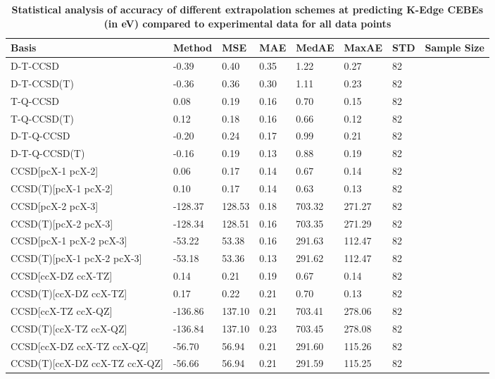 \begin{table}
  \caption{\textbf{Statistical analysis of accuracy of different extrapolation schemes at predicting K-Edge CEBEs (in eV) compared to experimental data for all data points}}
  \label{tbl:extrap-all-summary}
  \begin{tabular}{l l l l l l l l }
    \toprule
    \textbf{Basis} & \textbf{Method} & \textbf{MSE} & \textbf{MAE} & \textbf{MedAE} & \textbf{MaxAE} & \textbf{STD} & \textbf{Sample Size} \\ 
    \midrule
    D-T-CCSD & -0.39 & 0.40 & 0.35 & 1.22 & 0.27 & 82 \\ 
    D-T-CCSD(T) & -0.36 & 0.36 & 0.30 & 1.11 & 0.23 & 82 \\ 
    T-Q-CCSD & 0.08 & 0.19 & 0.16 & 0.70 & 0.15 & 82 \\ 
    T-Q-CCSD(T) & 0.12 & 0.18 & 0.16 & 0.66 & 0.12 & 82 \\ 
    D-T-Q-CCSD & -0.20 & 0.24 & 0.17 & 0.99 & 0.21 & 82 \\ 
    D-T-Q-CCSD(T) & -0.16 & 0.19 & 0.13 & 0.88 & 0.19 & 82 \\ 
    CCSD[pcX-1 pcX-2] & 0.06 & 0.17 & 0.14 & 0.67 & 0.14 & 82 \\ 
    CCSD(T)[pcX-1 pcX-2] & 0.10 & 0.17 & 0.14 & 0.63 & 0.13 & 82 \\ 
    CCSD[pcX-2 pcX-3] & -128.37 & 128.53 & 0.18 & 703.32 & 271.27 & 82 \\ 
    CCSD(T)[pcX-2 pcX-3] & -128.34 & 128.51 & 0.16 & 703.35 & 271.29 & 82 \\ 
    CCSD[pcX-1 pcX-2 pcX-3] & -53.22 & 53.38 & 0.16 & 291.63 & 112.47 & 82 \\ 
    CCSD(T)[pcX-1 pcX-2 pcX-3] & -53.18 & 53.36 & 0.13 & 291.62 & 112.47 & 82 \\ 
    CCSD[ccX-DZ ccX-TZ] & 0.14 & 0.21 & 0.19 & 0.67 & 0.14 & 82 \\ 
    CCSD(T)[ccX-DZ ccX-TZ] & 0.17 & 0.22 & 0.21 & 0.70 & 0.13 & 82 \\ 
    CCSD[ccX-TZ ccX-QZ] & -136.86 & 137.10 & 0.21 & 703.41 & 278.06 & 82 \\ 
    CCSD(T)[ccX-TZ ccX-QZ] & -136.84 & 137.10 & 0.23 & 703.45 & 278.08 & 82 \\ 
    CCSD[ccX-DZ ccX-TZ ccX-QZ] & -56.70 & 56.94 & 0.21 & 291.60 & 115.26 & 82 \\ 
    CCSD(T)[ccX-DZ ccX-TZ ccX-QZ] & -56.66 & 56.94 & 0.21 & 291.59 & 115.25 & 82 \\ 
    \bottomrule
  \end{tabular}
\end{table}
